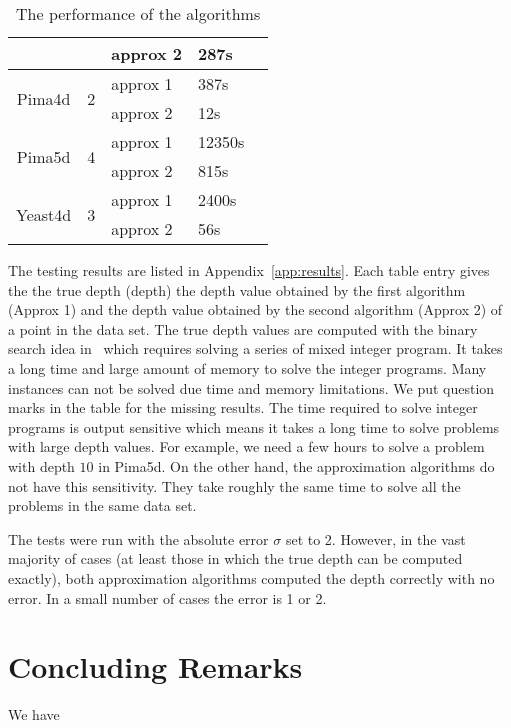 \documentclass{patmorin}
\begin{document}
\begin{table}[!htb]
\begin{tabular}[center]{|c|c|l|l|l|}
    & & approx 2 & 287s & \\
    \hline
    \multirow{2}{*}{Pima4d} & \multirow{2}{*}{2} & approx 1 & 387s & \\
    & & approx 2 & 12s & \\
    \hline
    \multirow{2}{*}{Pima5d} & \multirow{2}{*}{4} & approx 1 & 12350s & \\
    & & approx 2 & 815s & \\
    \hline
    \multirow{2}{*}{Yeast4d} & \multirow{2}{*}{3} & approx 1 & 2400s & \\
    & & approx 2 & 56s & \\
    \hline
  \end{tabular}
  \caption{The performance of the algorithms}
  \label{tab:performance}
\end{table}

The testing results are listed in Appendix~\ref{app:results}.  Each table entry gives the the true depth (depth) the depth value obtained by the first algorithm (Approx 1) and the depth value obtained by the second algorithm (Approx 2) of a point in the data set. The true depth values are computed with the binary search idea in~\cite{Chen07} which requires solving a series of mixed integer program. It takes a long time and large amount of memory to solve the integer programs. Many instances can not be solved due time and memory limitations. We put question marks in the table for the missing results. The time required to solve integer programs is output sensitive which means it takes a long time to solve problems with large depth values. For example, we need a few hours to solve a problem with depth $10$ in Pima5d. On the other hand, the approximation algorithms do not have this sensitivity. They take roughly the same time to solve all the problems in the same data set.

The tests were run with the absolute error $\sigma$ set to 2.  However,
in the vast majority of cases (at least those in which the true depth
can be computed exactly), both approximation algorithms computed the
depth correctly with no error.  In a small number of cases the error is 1 or 2.


\section{Concluding Remarks}
\label{sec:cld}

We have
\end{document}
